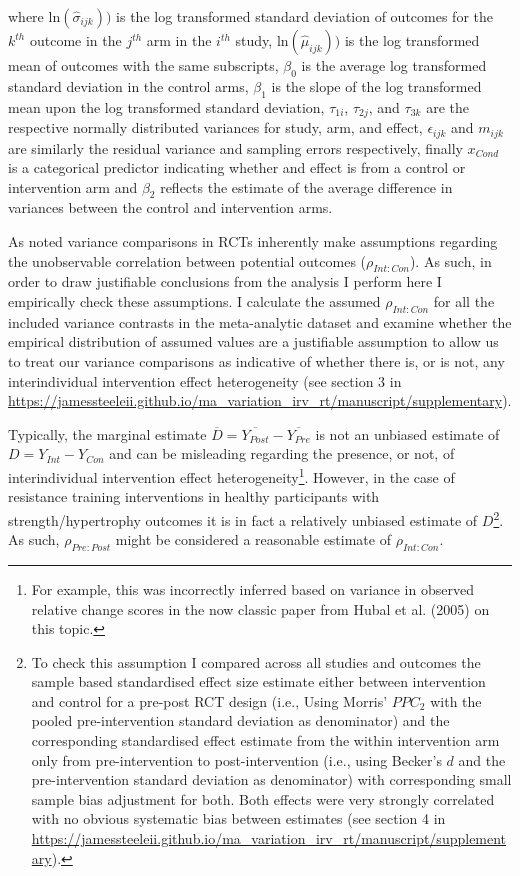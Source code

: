 \documentclass[
]{article}
\begin{document}
where \(\text{ln}(\hat{\sigma}_{ijk}))\) is the log transformed standard
deviation of outcomes for the \(k^{th}\) outcome in the \(j^{th}\) arm
in the \(i^{th}\) study, \(\text{ln}(\hat{\mu}_{ijk}))\) is the log
transformed mean of outcomes with the same subscripts, \(\beta_{0}\) is
the average log transformed standard deviation in the control arms,
\(\beta_{1}\) is the slope of the log transformed mean upon the log
transformed standard deviation, \(\tau_{1i}\), \(\tau_{2j}\), and
\(\tau_{3k}\) are the respective normally distributed variances for
study, arm, and effect, \(\epsilon_{ijk}\) and \(m_{ijk}\) are similarly
the residual variance and sampling errors respectively, finally
\(x_{Cond}\) is a categorical predictor indicating whether and effect is
from a control or intervention arm and \(\beta_{2}\) reflects the
estimate of the average difference in variances between the control and
intervention arms.

As noted variance comparisons in RCTs inherently make assumptions
regarding the unobservable correlation between potential outcomes
(\(\rho_{Int:Con}\)). As such, in order to draw justifiable conclusions
from the analysis I perform here I empirically check these assumptions.
I calculate the assumed \(\rho_{Int:Con}\) for all the included variance
contrasts in the meta-analytic dataset and examine whether the empirical
distribution of assumed values are a justifiable assumption to allow us
to treat our variance comparisons as indicative of whether there is, or
is not, any interindividual intervention effect heterogeneity (see
section 3 in
\url{https://jamessteeleii.github.io/ma_variation_irv_rt/manuscript/supplementary}).

Typically, the marginal estimate
\(\overline{D}=\overline{Y_{Post}}-\overline{Y_{Pre}}\) is not an
unbiased estimate of \(D=Y_{Int}-Y_{Con}\) and can be misleading
regarding the presence, or not, of interindividual intervention effect
heterogeneity\footnote{For example, this was incorrectly inferred based
  on variance in observed relative change scores in the now classic
  paper from Hubal et al. (2005) on this topic.}. However, in the case
of resistance training interventions in healthy participants with
strength/hypertrophy outcomes it is in fact a relatively unbiased
estimate of \(D\)\footnote{To check this assumption I compared across
  all studies and outcomes the sample based standardised effect size
  estimate either between intervention and control for a pre-post RCT
  design (i.e., Using Morris' \(PPC_2\) with the pooled pre-intervention
  standard deviation as denominator) and the corresponding standardised
  effect estimate from the within intervention arm only from
  pre-intervention to post-intervention (i.e., using Becker's \(d\) and
  the pre-intervention standard deviation as denominator) with
  corresponding small sample bias adjustment for both. Both effects were
  very strongly correlated with no obvious systematic bias between
  estimates (see section 4 in
  \url{https://jamessteeleii.github.io/ma_variation_irv_rt/manuscript/supplementary}).}.
As such, \(\rho_{Pre:Post}\) might be considered a reasonable estimate
of \(\rho_{Int:Con}\).
\end{document}

